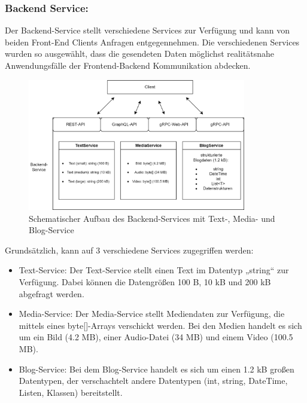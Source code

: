 \subsubsection*{Backend Service:}
Der Backend-Service stellt verschiedene Services zur Verfügung und kann von beiden Front-End Clients Anfragen entgegennehmen.
Die verschiedenen Services wurden so ausgewählt, dass die gesendeten Daten möglichst realitätsnahe Anwendungsfälle der Frontend-Backend Kommunikation abdecken.

\begin{figure}[htbp]
	\centering
	\includegraphics[width=0.85\textwidth]{images/BackendService.png}
	\caption{Schematischer Aufbau des Backend-Services mit Text-, Media- und Blog-Service}
	\label{fig:backendservice}
\end{figure}

Grundsätzlich, kann auf 3 verschiedene Services zugegriffen werden:

\begin{itemize}
	\item Text-Service: 
	Der Text-Service stellt einen Text im Datentyp „string“ zur Verfügung. Dabei können die Datengrößen 100 B, 10 kB und 200 kB abgefragt werden.
	
	\item Media-Service:
	Der Media-Service stellt Mediendaten zur Verfügung, die mittels eines byte[]-Arrays verschickt werden. Bei den Medien handelt es sich um ein Bild (4.2 MB), einer Audio-Datei (34 MB) und einem Video (100.5 MB). 
	
	\item Blog-Service: 
	Bei dem Blog-Service handelt es sich um einen 1.2 kB großen Datentypen, der verschachtelt andere Datentypen (int, string, DateTime, Listen, Klassen) bereitstellt.
	
\end{itemize}

